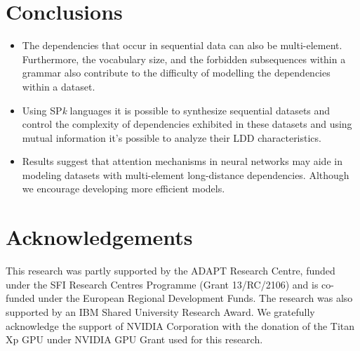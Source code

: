 \documentclass[a0,portrait]{a0poster}
\begin{document}
\begin{multicols}{2}

\section*{Conclusions}

\begin{itemize}
\item The dependencies that occur in sequential data can also be multi-element. Furthermore, the vocabulary size, and the forbidden subsequences within a grammar also contribute to the difficulty of modelling the dependencies within a dataset.
\item Using SP\emph{k} languages it is possible to synthesize sequential datasets and control the complexity of dependencies exhibited in these datasets and using mutual information it's possible to analyze their LDD characteristics.
\item Results suggest that attention mechanisms in neural networks may aide in modeling datasets with multi-element long-distance dependencies. Although we encourage developing more efficient models.
\end{itemize}


\nocite{*} %


\section*{Acknowledgements}

This research was partly supported by the ADAPT Research Centre, funded under the SFI Research Centres Programme (Grant 13/RC/2106) and is co-funded under the European Regional Development Funds. The research was also supported by an IBM Shared University Research Award. We gratefully acknowledge the support of NVIDIA Corporation with the donation of the Titan Xp GPU under NVIDIA GPU Grant used for this research.


\end{multicols}
\end{document}
